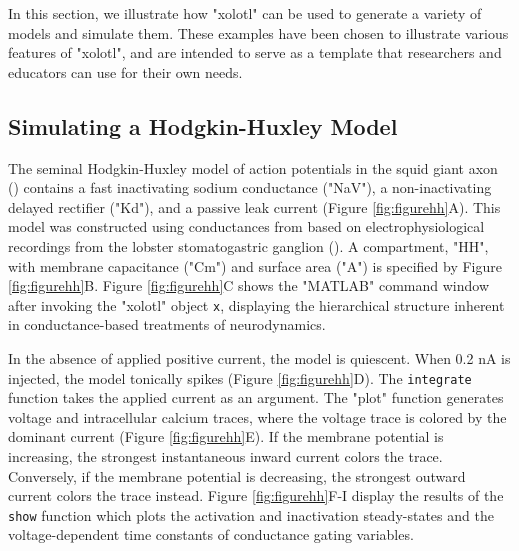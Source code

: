 \documentclass{frontiersSCNS} %
\begin{document}
In this section, we illustrate how "xolotl" can be used to generate a variety of models and simulate them. These examples have been chosen to illustrate various features of "xolotl", and are intended to serve as a template that researchers and educators can use for their own needs. 

%
%
%
%
%
%

\subsection{Simulating a Hodgkin-Huxley Model}

The seminal Hodgkin-Huxley model of action potentials in the squid giant axon (\cite{hodgkinComponentsMembraneConductance1952, hodgkinMeasurementCurrentvoltageRelations1952}) contains a fast inactivating sodium conductance ("NaV"), a non-inactivating delayed rectifier ("Kd"), and a passive leak current (Figure \ref{fig:figurehh}A). This model was constructed using conductances from \cite{liuModelNeuronActivitydependent1998} based on electrophysiological recordings from the lobster stomatogastric ganglion (\cite{turrigianoSelectiveRegulationCurrent1995}). A compartment, "HH", with membrane capacitance ("Cm") and surface area ("A") is specified by Figure \ref{fig:figurehh}B. Figure \ref{fig:figurehh}C shows the "MATLAB" command window after invoking the "xolotl" object \texttt{x}, displaying the hierarchical structure inherent in conductance-based treatments of neurodynamics.

In the absence of applied positive current, the model is quiescent. When 0.2 nA is injected, the model tonically spikes (Figure \ref{fig:figurehh}D). The \texttt{integrate} function takes the applied current as an argument. The "plot" function generates voltage and intracellular calcium traces, where the voltage trace is colored by the dominant current (Figure \ref{fig:figurehh}E). If the membrane potential is increasing, the strongest instantaneous inward current colors the trace. Conversely, if the membrane potential is decreasing, the strongest outward current colors the trace instead. Figure \ref{fig:figurehh}F-I display the results of the \texttt{show} function which plots the activation and inactivation steady-states and the voltage-dependent time constants of conductance gating variables.

%
%
%
%
%
%
\end{document}
